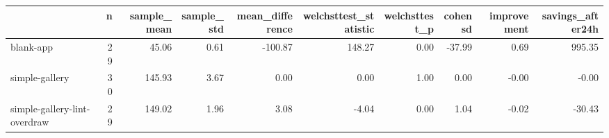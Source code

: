 \begin{tabular}{lrrrrrrrrr}
\toprule
{} &   n &  sample\_mean &  sample\_std &  mean\_difference &  welchsttest\_statistic &  welchsttest\_p &  cohensd &  improvement &  savings\_after24h \\
\midrule
blank-app                    &  29 &        45.06 &        0.61 &          -100.87 &                 148.27 &           0.00 &   -37.99 &         0.69 &            995.35 \\
simple-gallery               &  30 &       145.93 &        3.67 &             0.00 &                   0.00 &           1.00 &     0.00 &        -0.00 &             -0.00 \\
simple-gallery-lint-overdraw &  29 &       149.02 &        1.96 &             3.08 &                  -4.04 &           0.00 &     1.04 &        -0.02 &            -30.43 \\
\bottomrule
\end{tabular}
